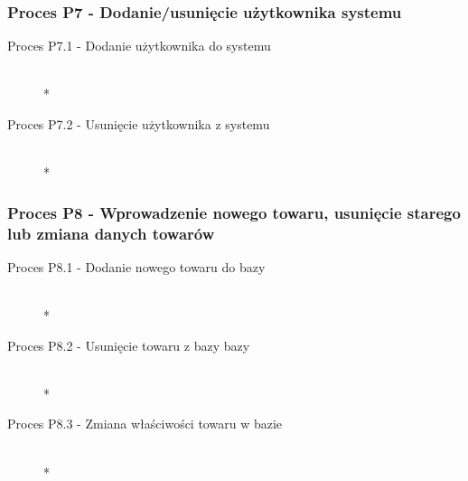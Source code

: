 \subsubsection{Proces P7 - Dodanie/usunięcie użytkownika systemu}
\begin{description}
\item[Proces P7.1 - Dodanie użytkownika do systemu] ~\\*
\item[Proces P7.2 - Usunięcie użytkownika z systemu] ~\\*
\end{description}
\subsubsection{Proces P8 - Wprowadzenie nowego towaru, usunięcie starego lub zmiana danych towarów}
\begin{description}
\item[Proces P8.1 - Dodanie nowego towaru do bazy] ~\\*
\item[Proces P8.2 - Usunięcie towaru z bazy bazy] ~\\*
\item[Proces P8.3 - Zmiana właściwości towaru w bazie] ~\\*
\end{description}